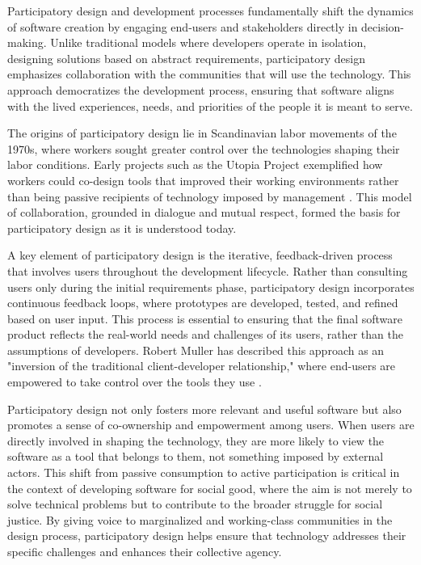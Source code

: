 \begin{refsection}
Participatory design and development processes fundamentally shift the dynamics of software creation by engaging end-users and stakeholders directly in decision-making. Unlike traditional models where developers operate in isolation, designing solutions based on abstract requirements, participatory design emphasizes collaboration with the communities that will use the technology. This approach democratizes the development process, ensuring that software aligns with the lived experiences, needs, and priorities of the people it is meant to serve.

The origins of participatory design lie in Scandinavian labor movements of the 1970s, where workers sought greater control over the technologies shaping their labor conditions. Early projects such as the Utopia Project exemplified how workers could co-design tools that improved their working environments rather than being passive recipients of technology imposed by management \cite[pp.~17-19]{greenbaum1993}. This model of collaboration, grounded in dialogue and mutual respect, formed the basis for participatory design as it is understood today.

A key element of participatory design is the iterative, feedback-driven process that involves users throughout the development lifecycle. Rather than consulting users only during the initial requirements phase, participatory design incorporates continuous feedback loops, where prototypes are developed, tested, and refined based on user input. This process is essential to ensuring that the final software product reflects the real-world needs and challenges of its users, rather than the assumptions of developers. Robert Muller has described this approach as an "inversion of the traditional client-developer relationship," where end-users are empowered to take control over the tools they use \cite[pp.~43-45]{muller2002}.

Participatory design not only fosters more relevant and useful software but also promotes a sense of co-ownership and empowerment among users. When users are directly involved in shaping the technology, they are more likely to view the software as a tool that belongs to them, not something imposed by external actors. This shift from passive consumption to active participation is critical in the context of developing software for social good, where the aim is not merely to solve technical problems but to contribute to the broader struggle for social justice. By giving voice to marginalized and working-class communities in the design process, participatory design helps ensure that technology addresses their specific challenges and enhances their collective agency.


\end{refsection}
